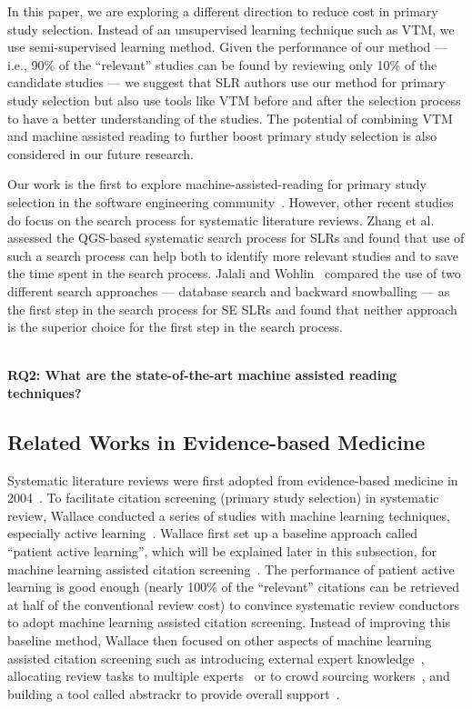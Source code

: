 \documentclass[final,twocolumn,5p]{elsarticle}
\theoremstyle{break}
\begin{document}
In this paper, we are exploring a different direction to reduce cost in primary
study selection. Instead of an unsupervised learning technique such as VTM, we use semi-supervised
learning method. Given the performance of our method --- i.e.,  90\% of the ``relevant''
studies can be found by reviewing only 10\% of the candidate studies --- we suggest that SLR
authors use our method for primary study selection but also use
tools like VTM before
and after the selection process to have a better understanding of the
studies. The potential of combining VTM and machine assisted reading to further
boost primary study selection is also considered in our future research.

Our work is the first to explore machine-assisted-reading for primary study selection in the software engineering community~\cite{hassler2016identification}.
However, other recent studies do focus on the search process for systematic literature reviews.
Zhang et al.~\cite{zhang2011empirical} assessed the QGS-based systematic search process for SLRs and found that use of such a search process can help both to identify more relevant studies and to save the time spent in the search process.
Jalali and Wohlin~\cite{jalali2012systematic} compared the use of two different search approaches --- database search and backward snowballing --- as the first step in the search process for SE SLRs and found that neither approach is the superior choice for the first step in the search process.

\ \\ \noindent 
{\bf RQ2: What are the state-of-the-art machine assisted reading techniques?} 

\subsection{Related Works in Evidence-based Medicine}
\label{sect: Evidence-based Medicine}

Systematic literature reviews were first adopted from evidence-based medicine in
2004~\cite{kitchenham2004evidence}. To facilitate citation screening (primary
study selection) in systematic review, Wallace conducted a series of studies
with machine learning techniques, especially active
learning~\cite{wallace2010semi,wallace2010active,wallace2011should,wallace2012deploying,wallace2013active,wallace2013modernizing,nguyen2015combining}. Wallace
first set up a baseline approach called ``patient active learning'', which will be explained later in this subsection, for machine learning assisted citation
screening~\cite{wallace2010semi}. The performance of patient active learning
is good enough (nearly 100\% of the ``relevant''
citations can be retrieved at half of the conventional review cost) to convince
systematic review conductors to adopt machine learning assisted citation
screening. Instead of improving this baseline method, Wallace then focused on other aspects of machine learning assisted citation screening such as introducing external expert knowledge~\cite{wallace2010active}, allocating review tasks to multiple experts~\cite{wallace2011should} or to crowd sourcing workers~\cite{nguyen2015combining}, and building a tool called abstrackr to provide overall support~\cite{wallace2012deploying}. 
\end{document}
